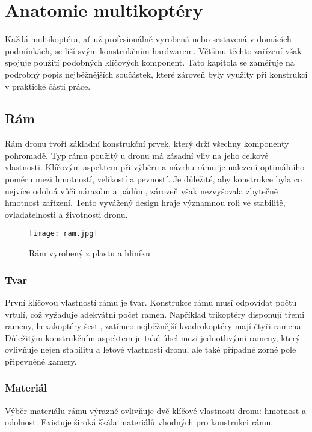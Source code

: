 \documentclass[12pt]{report}
\begin{document}
\chapter[Anatomie multikoptéry]{Anatomie multikoptéry}
Každá multikoptéra, ať už profesionálně vyrobená nebo sestavená v domácích podmínkách, se liší svým konstrukčním hardwarem. Většinu těchto zařízení však spojuje použití podobných klíčových komponent. Tato kapitola se zaměřuje na podrobný popis nejběžnějších součástek, které zároveň byly využity při konstrukci v praktické části práce.

\section{Rám}
Rám dronu tvoří základní konstrukční prvek, který drží všechny komponenty pohromadě. Typ rámu použitý u dronu má zásadní vliv na jeho celkové vlastnosti. Klíčovým aspektem při výběru a návrhu rámu je nalezení optimálního poměru mezi hmotností, velikostí a pevností. Je důležité, aby konstrukce byla co nejvíce odolná vůči nárazům a pádům, zároveň však nezvyšovala zbytečně hmotnost zařízení. Tento vyvážený design hraje významnou roli ve stabilitě, ovladatelnosti a životnosti dronu.

\begin{figure}[H]
	\centering
	\texttt{[image: ram.jpg]}
	\caption{Rám vyrobený z plastu a hliníku \cite{mainbook}}
	\label{fig:ram.jpg}
  \end{figure}

\subsection{Tvar}
První klíčovou vlastností rámu je tvar. Konstrukce rámu musí odpovídat počtu vrtulí, což vyžaduje adekvátní počet ramen. Například trikoptéry disponují třemi rameny, hexakoptéry šesti, zatímco nejběžnější kvadrokoptéry mají čtyři ramena. Důležitým konstrukčním aspektem je také úhel mezi jednotlivými rameny, který ovlivňuje nejen stabilitu a letové vlastnosti dronu, ale také případné zorné pole připevněné kamery.

\subsection{Materiál}
Výběr materiálu rámu výrazně ovlivňuje dvě klíčové vlastnosti dronu: hmotnost a odolnost. Existuje široká škála materiálů vhodných pro konstrukci rámu.\\
\end{document}

